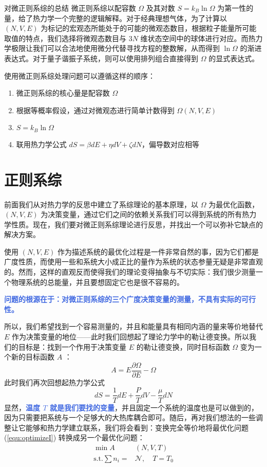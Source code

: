 \documentclass[hyperref,UTF-8]{ctexart}
\newcommand{\0}{\boldsymbol{0}}
\begin{document}
\begin{understanding}{\kaishu 对微正则系综的总结}
\kaishu \fontsize{11pt}{16pt}
\quad\quad 微正则系综以配容数 $\Omega $ 及其对数 $S = k_B \ln \Omega$ 为第一性的量，给了热力学一个完整的逻辑解释。对于经典理想气体，为了计算以 $(N,V,E)$ 为标记的宏观态所能处于的可能的微观态数目，根据粒子能量所可能取值的特点，我们选择将微观态数目与 $3N$ 维状态空间中的球体进行对应。而热力学极限让我们可以合法地使用微分代替寻找方程的整数解，从而得到 $\ln \Omega$ 的渐进表达式。对于量子谐振子系统，则可以使用排列组合直接得到 $\Omega$ 的显式表达式。

\quad\quad 使用微正则系综处理问题可以遵循这样的顺序：
    \begin{enumerate}
        \item 微正则系综的核心量是配容数 $\Omega$
        \item 根据等概率假设，通过对微观态进行简单计数得到 $\Omega(N,V,E)$
        \item $S = k_B \ln \Omega$
        \item 联用热力学公式 $dS = \beta dE + \eta dV + \zeta dN$，偏导数对应相等
    \end{enumerate}

\end{understanding}

\section{正则系综}

前面我们从对热力学的反思中建立了系综理论的基本原理，以 $\Omega$ 为最优化函数， $(N,V,E)$ 为决策变量，通过它们之间的依赖关系我们可以得到系统的所有热力学性质。现在，我们要对微正则系综理论进行反思，并找出一个可以弥补它缺点的解决方案。

使用 $(N,V,E)$ 作为描述系统的最优化过程是一件非常自然的事，因为它们都是广度性质，而使用一些和系统大小成正比的量作为系统的状态参量无疑是非常直观的。然而，这样的直观反而使得我们的理论变得抽象与不切实际：我们很少测量一个物理系统的总能量，并且要想固定它也是很不容易的。

\textcolor{RoyalBlue}{\textbf{\kaishu 问题的根源在于：对微正则系综的三个广度决策变量的测量，不具有实际的可行性。}}  

所以，我们希望找到一个容易测量的，并且和能量具有相同内涵的量来等价地替代 $E$ 作为决策变量的地位——此时我们回想起了理论力学中的勒让德变换。所以我们的目标是：找到一个作用于决策变量 $E$ 的勒让德变换，同时目标函数 $\Omega$ 变为一个新的目标函数 $A$ ：
\[
    A = E\frac{\partial \Omega}{\partial E} - \Omega
\]
此时我们再次回想起热力学公式
\[
    dS = \frac{1}{T} dE + \frac{P}{T} dV - \frac{\mu}{T} dN
\]
显然，\textcolor{RoyalBlue}{\textbf{\kaishu 温度 $T$ 就是我们要找的变量}}，并且固定一个系统的温度也是可以做到的，因为只需要把系统与一个足够大的大热库耦合即可。随后，再对我们想法的一些调整让它能够和热力学建立联系，我们将会看到：变换完全等价地将最优化问题 (\ref*{equ:optimizeI}) 转换成另一个最优化问题：
\begin{equation}\label{equ:optimizeII}
    \begin{split}
        \min A&(N,V,T)\\
        \text{s.t.}\sum n_i = &\mathcal{N},\quad T = T_0
    \end{split}
\end{equation}
\end{document}

